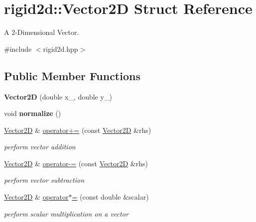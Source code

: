 \hypertarget{structrigid2d_1_1Vector2D}{}\section{rigid2d\+:\+:Vector2D Struct Reference}
\label{structrigid2d_1_1Vector2D}


A 2-\/\+Dimensional Vector.  




{\ttfamily \#include $<$rigid2d.\+hpp$>$}

\subsection*{Public Member Functions}
\begin{DoxyCompactItemize}
\item 
\mbox{\label{structrigid2d_1_1Vector2D_a7676be61234533fc4c569fc27fd78a9e}} 
{\bfseries Vector2D} (double x\+\_\+, double y\+\_\+)
\item 
\mbox{\label{structrigid2d_1_1Vector2D_a0be56967b3920a398291ea722c540114}} 
void {\bfseries normalize} ()
\item 
\hyperlink{structrigid2d_1_1Vector2D}{Vector2D} \& \hyperlink{structrigid2d_1_1Vector2D_a2e20ab3a7d186527955370e58df504ec}{operator+=} (const \hyperlink{structrigid2d_1_1Vector2D}{Vector2D} \&rhs)
\begin{DoxyCompactList}\small\item\em perform vector addition \end{DoxyCompactList}\item 
\hyperlink{structrigid2d_1_1Vector2D}{Vector2D} \& \hyperlink{structrigid2d_1_1Vector2D_a43ee2a20c766c24809e243cebbdae224}{operator-\/=} (const \hyperlink{structrigid2d_1_1Vector2D}{Vector2D} \&rhs)
\begin{DoxyCompactList}\small\item\em perform vector subtraction \end{DoxyCompactList}\item 
\hyperlink{structrigid2d_1_1Vector2D}{Vector2D} \& \hyperlink{structrigid2d_1_1Vector2D_a28ed19c24dd07b32695109c55fe95686}{operator$\ast$=} (const double \&scalar)
\begin{DoxyCompactList}\small\item\em perform scalar multiplication on a vector \end{DoxyCompactList}\end{DoxyCompactItemize}
